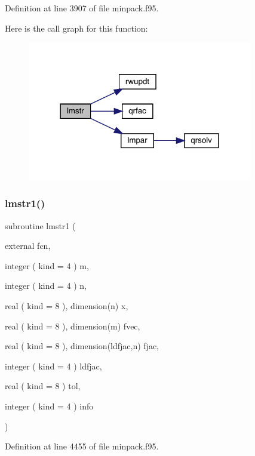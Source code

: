 Definition at line 3907 of file minpack.\+f95.

Here is the call graph for this function\+:\nopagebreak
\begin{figure}[H]
\begin{center}
\leavevmode
\includegraphics[width=278pt]{minpack_8f95_a178ff688f77b7192504790b6741ecd4d_cgraph}
\end{center}
\end{figure}
\mbox{\label{minpack_8f95_acee42ee803b3870261fa529dc123a892}} 
\subsubsection{\texorpdfstring{lmstr1()}{lmstr1()}}
{\footnotesize\ttfamily subroutine lmstr1 (\begin{DoxyParamCaption}\item[{external}]{fcn,  }\item[{integer ( kind = 4 )}]{m,  }\item[{integer ( kind = 4 )}]{n,  }\item[{real ( kind = 8 ), dimension(n)}]{x,  }\item[{real ( kind = 8 ), dimension(m)}]{fvec,  }\item[{real ( kind = 8 ), dimension(ldfjac,n)}]{fjac,  }\item[{integer ( kind = 4 )}]{ldfjac,  }\item[{real ( kind = 8 )}]{tol,  }\item[{integer ( kind = 4 )}]{info }\end{DoxyParamCaption})}



Definition at line 4455 of file minpack.\+f95.

